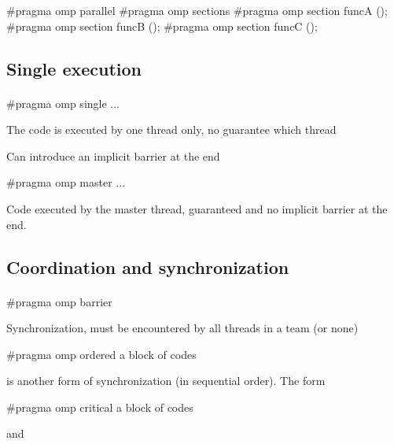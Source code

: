 \documentclass[%
oneside,                 %
final,                   %
10pt]{article}
\begin{document}
\bcppcod
#pragma omp parallel
{
#pragma omp sections
{
#pragma omp section
funcA ();
#pragma omp section
funcB ();
#pragma omp section
funcC ();
}
}

\ecppcod



\subsection{Single execution}

\paragraph{}


\bcppcod
#pragma omp single { ... }

\ecppcod

The code is executed by one thread only, no guarantee which thread

Can introduce an implicit barrier at the end


\bcppcod
#pragma omp master { ... }

\ecppcod

Code executed by the master thread, guaranteed and no implicit barrier at the end.



\subsection{Coordination and synchronization}

\paragraph{}


\bcppcod
#pragma omp barrier

\ecppcod

Synchronization, must be encountered by all threads in a team (or none)


\bcppcod
#pragma omp ordered { a block of codes }

\ecppcod

is another form of synchronization (in sequential order).
The form


\bcppcod
#pragma omp critical { a block of codes }

\ecppcod

and 
\end{document}
